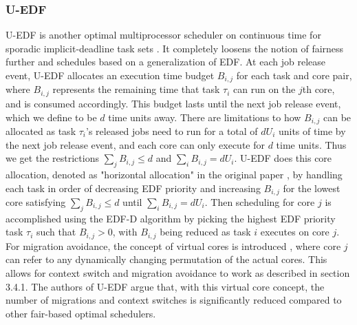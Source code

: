 \documentclass[conference,compsoc]{IEEEtran}
\begin{document}
\subsubsection{U-EDF}
U-EDF is another optimal multiprocessor scheduler on continuous time for sporadic implicit-deadline task sets \cite{uedf}. It completely loosens the notion of fairness further and schedules based on a generalization of EDF. At each job release event, U-EDF allocates an execution time budget $B_{i,j}$ for each task and core pair, where $B_{i,j}$ represents the remaining time that task $\tau_i$ can run on the $j$th core, and is consumed accordingly. This budget lasts until the next job release event, which we define to be $d$ time units away. There are limitations to how $B_{i,j}$ can be allocated as task $\tau_i$'s released jobs need to run for a total of $dU_i$ units of time by the next job release event, and each core can only execute for $d$ time units. Thus we get the restrictions $\sum_j B_{i,j} \leq d$ and $\sum_i B_{i,j} = dU_i$. U-EDF does this core allocation, denoted as "horizontal allocation" in the original paper \cite{uedf}, by handling each task in order of decreasing EDF priority and increasing $B_{i,j}$ for the lowest core satisfying $\sum_j B_{i,j} \leq d$ until $\sum_i B_{i,j} = dU_i$. Then scheduling for core $j$ is accomplished using the EDF-D algorithm \cite{uedf} by picking the highest EDF priority task $\tau_i$ such that $B_{i,j} > 0$, with $B_{i,j}$ being reduced as task $i$ executes on core $j$. For migration avoidance, the concept of virtual cores is introduced \cite{uedf}, where core $j$ can refer to any dynamically changing permutation of the actual cores. This allows for context switch and migration avoidance to work as described in section 3.4.1. The authors of U-EDF argue that, with this virtual core concept, the number of migrations and context switches is significantly reduced compared to other fair-based optimal schedulers.
\end{document}
